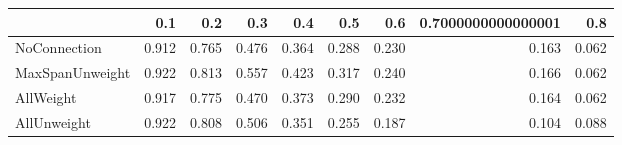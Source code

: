 \begin{tabular}{lrrrrrrrr}
\toprule
{} &   0.1 &   0.2 &   0.3 &   0.4 &   0.5 &   0.6 & 0.7000000000000001 &   0.8 \\
\midrule
NoConnection    & 0.912 & 0.765 & 0.476 & 0.364 & 0.288 & 0.230 &              0.163 & 0.062 \\
MaxSpanUnweight & 0.922 & 0.813 & 0.557 & 0.423 & 0.317 & 0.240 &              0.166 & 0.062 \\
AllWeight       & 0.917 & 0.775 & 0.470 & 0.373 & 0.290 & 0.232 &              0.164 & 0.062 \\
AllUnweight     & 0.922 & 0.808 & 0.506 & 0.351 & 0.255 & 0.187 &              0.104 & 0.088 \\
\bottomrule
\end{tabular}
